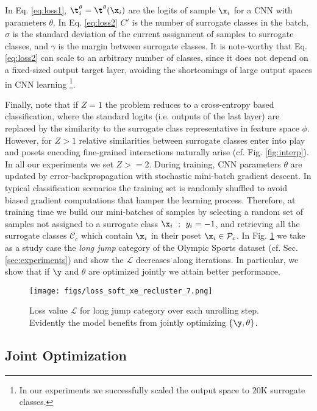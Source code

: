 \documentclass[10pt,twocolumn,letterpaper]{article}
\begin{document}
In Eq. \eqref{eq:loss1}, $\t^\theta_i = \t^\theta(\x_i)$ are the logits of sample $\x_i$ for a CNN with parameters $\theta$. In Eq. \eqref{eq:loss2} $C'$ is the number of surrogate classes in the batch, $\sigma$ is the standard deviation of the current assignment of samples to surrogate classes, and $\gamma$ is the margin between surrogate classes. It is note-worthy that Eq. \eqref{eq:loss2} can scale to an arbitrary number of classes, since it does not depend on a fixed-sized output target layer, avoiding the shortcomings of large output spaces in CNN learning \cite{outputspace} \footnote{In our experiments we successfully scaled the output space to $20$K surrogate classes.}.

Finally, note that if $Z=1$ the problem reduces to a cross-entropy based classification, where the standard logits (i.e. outputs of the last layer) are replaced by the similarity to the surrogate class representative in feature space $\phi$. However, for $Z>1$ relative similarities between surrogate classes enter into play and posets encoding fine-grained interactions naturally arise (cf. Fig. \ref{fig:interp}). In all our experiments we set $Z>=2$. During training, CNN parameters $\theta$ are updated by error-backpropagation with stochastic mini-batch gradient descent. In typical classification scenarios the training set is randomly shuffled to avoid biased gradient computations that hamper the learning process. Therefore, at training time we build our mini-batches of samples by selecting a random set of samples not assigned to a surrogate class $\x_i~:~y_i=-1$, and retrieving all the surrogate classes $\mathcal{C}_c$ which contain $\x_i$ in their poset $\x_i \in \mathcal{P}_c$. In Fig. \ref{fig:loss_reclustering} we take as a study case the \textit{long jump} category of the Olympic Sports dataset (cf. Sec. \ref{sec:experiments}) and show the $\mathcal{L}$ decreases along iterations. In particular, we show that if $\y$ and $\theta$ are optimized jointly we attain better performance.
 
 \begin{figure}
\texttt{[image: figs/loss\_soft\_xe\_recluster\_7.png]}
\caption{Loss value $\mathcal{L}$ for long jump category over each unrolling step. Evidently the model benefits from jointly optimizing $\{\y, \theta\}$.}
\label{fig:loss_reclustering}
\end{figure}



\subsection{Joint Optimization}\label{sec:recurrent}
\end{document}
